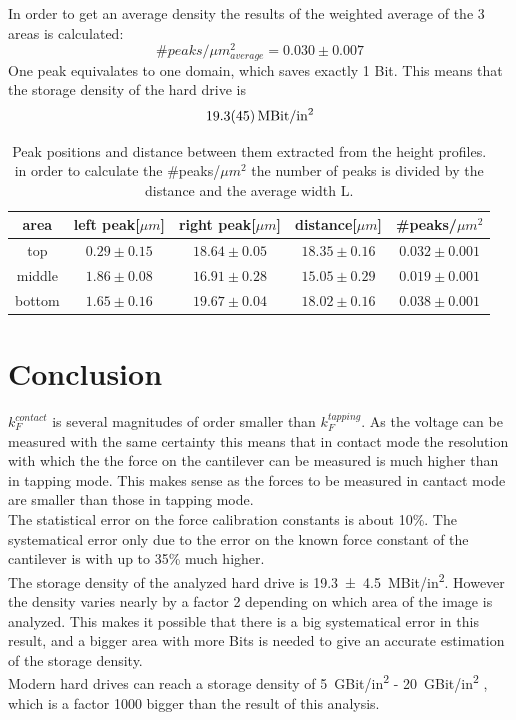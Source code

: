 \documentclass[%
 reprint,
amsmath,amssymb,
pra,
]{revtex4-1}
\begin{document}
In order to get an average density the results of the weighted average of the 3 areas is calculated:
\begin{equation*}
\#peaks/\mu m^2_{average} = 0.030 \pm 0.007
\end{equation*}
One peak equivalates to one domain, which saves exactly 1 Bit. This means that the storage density of the hard drive is
\begin{equation*}
\SI{19.3\pm 4.5}{MBit/in^2}
\end{equation*}





\begin{table}[h]
\centering
\begin{tabular}{|c|c|c|c|c|}
\hline 
area & left peak[$\mu m$] & right peak[$\mu m$] & distance[$\mu m$] & \#peaks/$\mu m^2$ \\ 
\hline 
top & $0.29 \pm 0.15$ & $18.64 \pm 0.05$ & $18.35 \pm 0.16$ & $0.032 \pm 0.001$\\ 
\hline
middle & $1.86 \pm 0.08$ & $16.91 \pm 0.28$ & $15.05 \pm 0.29$ & $0.019 \pm 0.001$\\ 
\hline
bottom & $1.65 \pm 0.16$ & $19.67 \pm 0.04$ & $18.02 \pm 0.16$ & $0.038 \pm 0.001$\\ 
\hline
\end{tabular} 
\caption{Peak positions and distance between them extracted from the height profiles. in order to calculate the \#peaks/$\mu m^2$ the number of peaks is divided by the distance and the average width L.}
\label{tab:magnetic_peaks}
\end{table}



\section{Conclusion}
\label{sec:Conclusion}
$k_F^{contact}$ is several magnitudes of order smaller than $k_F^{tapping}$. As the voltage can be measured with the same certainty this means that in contact mode the resolution with which the the force on the cantilever can be measured is much higher than in tapping mode. This makes sense as the forces to be measured in cantact mode are smaller than those in tapping mode. \\
The statistical error on the force calibration constants is about 10\%. The systematical error only due to the error on the known force constant of the cantilever is with up to 35\% much higher. 
\\
The storage density of the analyzed hard drive is \SI{19.3\pm 4.5}{MBit/in^2}. However the density varies nearly by a factor 2 depending on which area of the image is analyzed. This makes it possible that there is a big systematical error in this result, and a bigger area with more Bits is needed to give an accurate estimation of the storage density.\\
Modern hard drives can reach a storage density of \SI{5}{GBit/in^2} - \SI{20}{GBit/in^2} \cite{Loss98}, which is a factor 1000 bigger than the result of this analysis.







\end{document}
